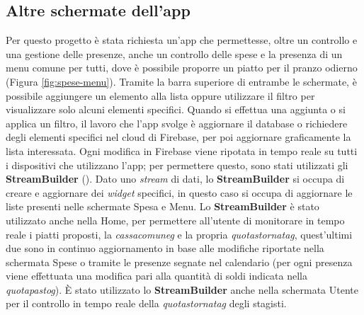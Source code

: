 \subsection{Altre schermate dell'app}
Per questo progetto è stata richiesta un'app che permettesse, oltre un controllo e una gestione delle presenze, anche un controllo delle spese e la presenza di un menu comune per tutti, dove è possibile proporre un piatto per il pranzo odierno (Figura \ref{fig:spese-menu}).\newline
Tramite la barra superiore di entrambe le schermate, è possibile aggiungere un elemento alla lista oppure utilizzare il filtro per visualizzare solo alcuni elementi specifici.\newline
\newline
Quando si effettua una aggiunta o si applica un filtro, il lavoro che l'app svolge è aggiornare il database o richiedere degli elementi specifici nel cloud di Firebase, per poi aggiornare graficamente la lista interessata.\newline
Ogni modifica in Firebase viene ripotata in tempo reale su tutti i dispositivi che utilizzano l'app; per permettere questo, sono stati utilizzati gli \textbf{StreamBuilder} (\cite{site:flutter-streambuilder}).\newline
Dato uno \emph{stream} di dati, lo \textbf{StreamBuilder} si occupa di creare e aggiornare dei \emph{widget} specifici, in questo caso si occupa di aggiornare le liste presenti nelle schermate Spesa e Menu.\newline
\newline
Lo \textbf{StreamBuilder} è stato utilizzato anche nella Home, per permettere all'utente di monitorare in tempo reale i piatti proposti, la \emph{\gls{cassacomuneg}} e la propria \emph{\gls{quotastornatag}}, quest'ultimi due sono in continuo aggiornamento in base alle modifiche riportate nella schermata Spese o tramite le presenze segnate nel calendario (per ogni presenza viene effettuata una modifica pari alla quantità di soldi indicata nella \emph{\gls{quotapastog}}).\newline
È stato utilizzato lo \textbf{StreamBuilder} anche nella schermata Utente per il controllo in tempo reale della \emph{\gls{quotastornatag}} degli stagisti.


